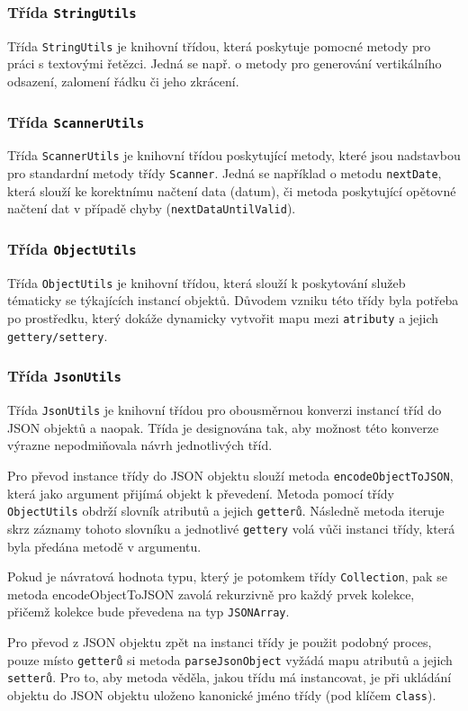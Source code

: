 \documentclass[FM,DP]{tulthesis}
\begin{document}
\subsubsection{Třída \texttt{StringUtils}}
Třída \texttt{StringUtils} je knihovní třídou, která poskytuje pomocné metody pro práci s textovými řetězci. Jedná se např. o metody pro generování vertikálního odsazení, zalomení řádku či jeho zkrácení.

\subsubsection{Třída \texttt{ScannerUtils}}
Třída \texttt{ScannerUtils} je knihovní třídou poskytující metody, které jsou nadstavbou pro standardní metody třídy \texttt{Scanner}. Jedná se například o metodu \texttt{nextDate}, která slouží ke korektnímu načtení data (datum), či metoda poskytující opětovné načtení dat v případě chyby (\texttt{nextDataUntilValid}).

\subsubsection{Třída \texttt{ObjectUtils}}
Třída \texttt{ObjectUtils} je knihovní třídou, která slouží k poskytování služeb tématicky se týkajících instancí objektů. Důvodem vzniku této třídy byla potřeba po prostředku, který dokáže dynamicky vytvořit mapu mezi \texttt{atributy} a jejich \texttt{gettery/settery}.

\subsubsection{Třída \texttt{JsonUtils}}
Třída \texttt{JsonUtils} je knihovní třídou pro obousměrnou konverzi instancí tříd do JSON objektů a naopak. Třída je designována tak, aby možnost této konverze výrazne nepodmiňovala návrh jednotlivých tříd.

Pro převod instance třídy do JSON objektu slouží metoda \texttt{encodeObjectToJSON}, která jako argument přijímá objekt k převedení. Metoda pomocí třídy \texttt{ObjectUtils} obdrží slovník atributů a jejich \texttt{getterů}. Následně metoda iteruje skrz záznamy tohoto slovníku a jednotlivé \texttt{gettery} volá vůči instanci třídy, která byla předána metodě v argumentu.

Pokud je návratová hodnota typu, který je potomkem třídy \texttt{Collection}, pak se metoda {encodeObjectToJSON} zavolá rekurzivně pro každý prvek kolekce, přičemž kolekce bude převedena na typ \texttt{JSONArray}.

Pro převod z JSON objektu zpět na instanci třídy je použit podobný proces, pouze místo \texttt{getterů} si metoda \texttt{parseJsonObject} vyžádá mapu atributů a jejich \texttt{setterů}. Pro to, aby metoda věděla, jakou třídu má instancovat, je při ukládání objektu do JSON objektu uloženo kanonické jméno třídy (pod klíčem \texttt{class}).
\end{document}
